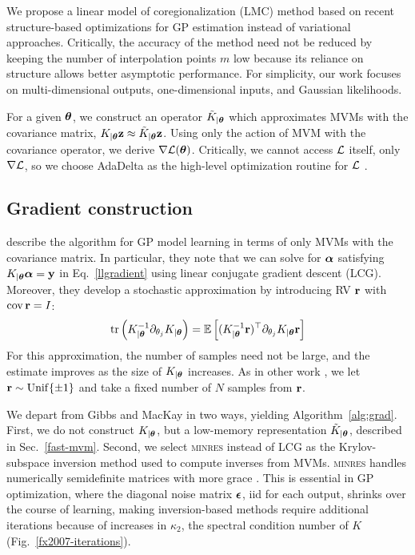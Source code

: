 \documentclass{article}
\begin{document}
We propose a linear model of coregionalization (LMC) method based on recent structure-based optimizations for GP estimation instead of variational approaches. Critically, the accuracy of the method need not be reduced by keeping the number of interpolation points $m$ low because its reliance on structure allows better asymptotic performance.
For simplicity, our work focuses on multi-dimensional outputs, one-dimensional inputs, and Gaussian likelihoods.

For a given ${\boldsymbol\theta}$, we construct an operator $\tilde{K}_{|{\boldsymbol\theta}}$ which approximates MVMs with the covariance matrix, $K_{|{\boldsymbol\theta}}\textbf{z}\approx \tilde{K}_{|{\boldsymbol\theta}}\textbf{z}$. Using only the action of MVM with the covariance operator, we derive $\nabla\mathcal{L}({\boldsymbol\theta})$. Critically, we cannot access $\mathcal{L}$ itself, only $\nabla\mathcal{L}$, so we choose AdaDelta as the high-level optimization routine for $\mathcal{L}$ \cite{zeiler2012adadelta}.

\subsection{Gradient construction}

\citet{gibbs1996cient} describe the algorithm for GP model learning in terms of only MVMs with the covariance matrix. In particular, they note that we can solve for ${\boldsymbol\alpha}$ satisfying $K_{|{\boldsymbol\theta}}{\boldsymbol\alpha}=\textbf{y}$ in Eq.~\ref{llgradient} using linear conjugate gradient descent (LCG). Moreover, they develop a stochastic approximation by introducing RV ${\textbf{r}}$ with $\operatorname{cov} {\textbf{r}}=I$:
\begin{align}
  \operatorname{tr}\left({K_{|{\boldsymbol\theta}}^{-1}\partial_{\theta_j}K_{|{\boldsymbol\theta}}}\right) = \operatorname{\mathbb{E}}\left[(K_{|{\boldsymbol\theta}}^{-1}{\textbf{r}})^\top\partial_{\theta_j}K_{|{\boldsymbol\theta}}{\textbf{r}}\right]\label{eq:trace}
\end{align}
For this approximation, the number of samples need not be large, and the estimate improves as the size of $K_{|{\boldsymbol\theta}}$ increases.
As in other work \cite{cutajar2016preconditioning}, we let ${\textbf{r}}\sim\operatorname{Unif}\{\pm 1\}$ and take a fixed number of $N$ samples from ${\textbf{r}}$.

We depart from Gibbs and MacKay in two ways, yielding Algorithm~\ref{alg:grad}. First, we do not construct $K_{|{\boldsymbol\theta}}$, but a low-memory representation $\tilde{K}_{|{\boldsymbol\theta}}$, described in Sec.~\ref{fast-mvm}. Second, we select \textsc{minres} instead of LCG as the Krylov-subspace inversion method used to compute inverses from MVMs. \textsc{minres} handles numerically semidefinite matrices with more grace \cite{fong2012cg}. This is essential in GP optimization, where the diagonal noise matrix ${\boldsymbol\epsilon}$, iid for each output, shrinks over the course of learning, making inversion-based methods require additional iterations because of increases in $\kappa_2$, the spectral condition number of $K$ (Fig.~\ref{fx2007-iterations}).
\end{document}
